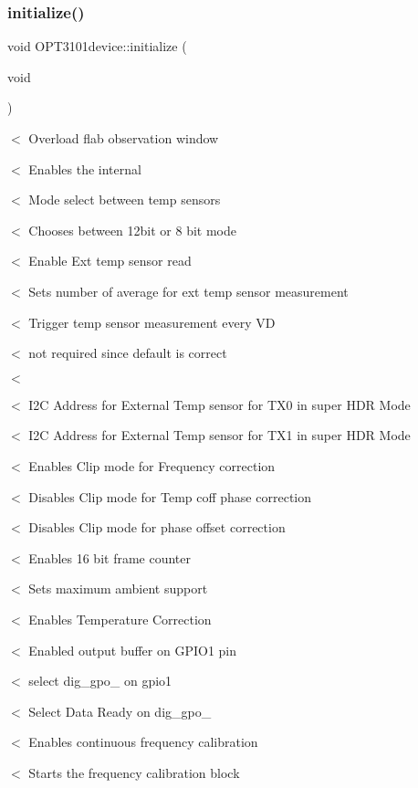 \mbox{\label{class_o_p_t3101device_a98d04c9a5359b4d62534556e6a3db290}} 
\subsubsection{\texorpdfstring{initialize()}{initialize()}}
{\footnotesize\ttfamily void O\+P\+T3101device\+::initialize (\begin{DoxyParamCaption}\item[{void}]{ }\end{DoxyParamCaption})}

$<$ Overload flab observation window

$<$ Enables the internal

$<$ Mode select between temp sensors

$<$ Chooses between 12bit or 8 bit mode

$<$ Enable Ext temp sensor read

$<$ Sets number of average for ext temp sensor measurement

$<$ Trigger temp sensor measurement every VD

$<$ not required since default is correct

$<$

$<$ I2C Address for External Temp sensor for T\+X0 in super H\+DR Mode

$<$ I2C Address for External Temp sensor for T\+X1 in super H\+DR Mode

$<$ Enables Clip mode for Frequency correction

$<$ Disables Clip mode for Temp coff phase correction

$<$ Disables Clip mode for phase offset correction

$<$ Enables 16 bit frame counter

$<$ Sets maximum ambient support

$<$ Enables Temperature Correction

$<$ Enabled output buffer on G\+P\+I\+O1 pin

$<$ select dig\+\_\+gpo\+\_ on gpio1

$<$ Select Data Ready on dig\+\_\+gpo\+\_

$<$ Enables continuous frequency calibration

$<$ Starts the frequency calibration block

